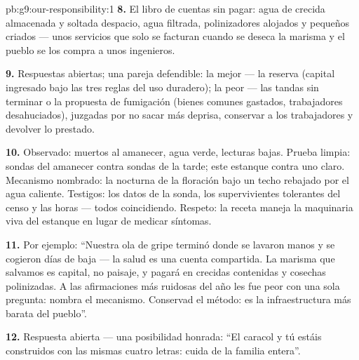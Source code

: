 \begin{solution}{pb:g9:our-responsibility:1}
\textbf{8.} El libro de cuentas sin pagar: agua de crecida almacenada y
soltada despacio, agua filtrada, polinizadores alojados y 
pequeños criados --- unos servicios que solo se facturan cuando se
deseca la marisma y el pueblo se los compra a unos ingenieros.

\textbf{9.} Respuestas abiertas; una pareja defendible: la mejor ---
la reserva (capital ingresado bajo las tres reglas del uso duradero);
la peor --- las tandas sin terminar o la propuesta de fumigación
(bienes comunes gastados, trabajadores desahuciados), juzgadas por no
sacar más deprisa, conservar a los trabajadores y devolver lo prestado.

\textbf{10.} Observado:  muertos al amanecer, agua verde, lecturas
bajas. Prueba limpia: sondas del amanecer contra sondas de la tarde;
este estanque contra uno claro. Mecanismo nombrado: la 
nocturna de la floración bajo un techo rebajado por el agua caliente.
Testigos: los datos de la sonda, los supervivientes tolerantes del
censo y las horas --- todos coincidiendo. Respeto: la receta maneja la
maquinaria viva del estanque en lugar de medicar síntomas.

\textbf{11.} Por ejemplo: ``Nuestra ola de gripe terminó donde se
lavaron manos y se cogieron días de baja --- la salud es una cuenta
compartida. La marisma que salvamos es capital, no paisaje, y pagará en
crecidas contenidas y cosechas polinizadas. A las afirmaciones más
ruidosas del año les fue peor con una sola pregunta: nombra el
mecanismo. Conservad el método: es la infraestructura más barata del
pueblo''.

\textbf{12.} Respuesta abierta --- una posibilidad honrada: ``El
caracol y tú estáis construidos con las mismas cuatro letras: cuida de
la familia entera''.
\end{solution}
